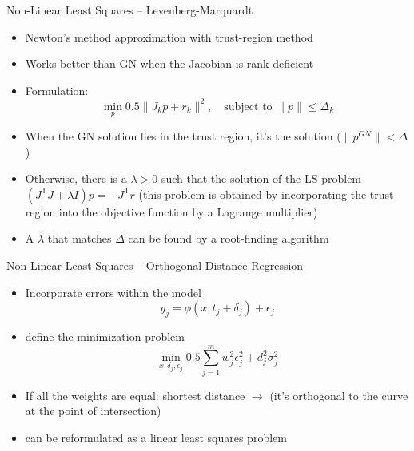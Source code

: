 \documentclass{beamer}
\newcommand{\tran}{\mathsf{T}}
\begin{document}
\begin{frame}{Non-Linear Least Squares -- Levenberg-Marquardt}
	\begin{itemize}
		\item Newton's method approximation with trust-region method
		\item Works better than GN when the Jacobian is rank-deficient
		\item Formulation:
		\begin{equation}
			\min_p 0.5 \| J_k p + r_k \|^2,\quad \text{subject to } \|p\| \leq \Delta_k
		\end{equation}
		\item When the GN solution lies in the trust region, it's the solution ($\|p^{GN}\| < \Delta$)
		\item Otherwise, there is a $\lambda >0$ such that the solution of the LS problem $(J^\tran J + \lambda I)p = -J^\tran r$ (this problem is obtained by incorporating the trust region into the objective function by a Lagrange multiplier)
		\item A $\lambda$ that matches $\Delta$ can be found by a root-finding algorithm
	\end{itemize}
\end{frame}

\begin{frame}{Non-Linear Least Squares -- Orthogonal Distance Regression}
	\begin{itemize}
		\item Incorporate errors within the model
		\[
			y_j = \phi(x;t_j+\delta_j) + \epsilon_j
		\]
		\item define the minimization problem
		\[
			\min_{x, \delta_j, \epsilon_j} 0.5 \sum_{j=1}^m w_j^2 \epsilon_j^2 + 	d_j^2\sigma_j^2
		\]
		\item If all the weights are equal: shortest distance $\rightarrow$ (it's orthogonal to the curve at the point of intersection)
		\item can be reformulated as a linear least squares problem
	\end{itemize}
\end{frame}
\end{document}
